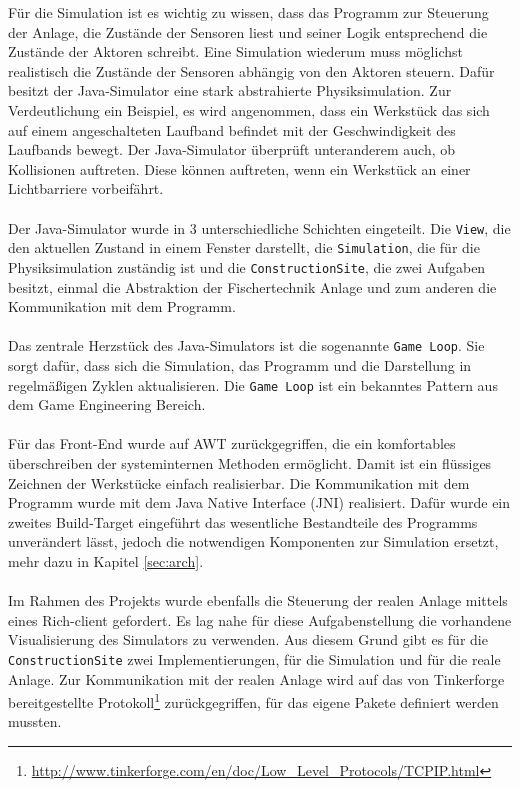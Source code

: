 \documentclass[fontsize=11pt,a4paper,final]{scrartcl}[2003/01/01]
\begin{document}
Für die Simulation ist es wichtig zu wissen, dass das Programm zur Steuerung der Anlage, die Zustände der Sensoren liest und seiner Logik entsprechend die Zustände der Aktoren schreibt. Eine Simulation wiederum muss möglichst realistisch die Zustände der Sensoren abhängig von den Aktoren steuern. Dafür besitzt der Java-Simulator eine stark abstrahierte Physiksimulation. Zur Verdeutlichung ein Beispiel, es wird angenommen, dass ein Werkstück das sich auf einem angeschalteten Laufband befindet mit der Geschwindigkeit des Laufbands bewegt. Der Java-Simulator überprüft unteranderem auch, ob Kollisionen auftreten. Diese können auftreten, wenn ein Werkstück an einer Lichtbarriere vorbeifährt.\\
\\
Der Java-Simulator wurde in 3 unterschiedliche Schichten eingeteilt. Die \lstinline|View|, die den aktuellen Zustand in einem Fenster darstellt, die \lstinline|Simulation|, die für die Physiksimulation zuständig ist und die \lstinline|ConstructionSite|, die zwei Aufgaben besitzt, einmal die Abstraktion der Fischertechnik Anlage und zum anderen die Kommunikation mit dem Programm.\\
\\
Das zentrale Herzstück des Java-Simulators ist die sogenannte \lstinline|Game Loop|. Sie sorgt dafür, dass sich die Simulation, das Programm und die Darstellung in regelmäßigen Zyklen aktualisieren. Die \lstinline|Game Loop| ist ein bekanntes Pattern aus dem Game Engineering Bereich.\\
\\
Für das Front-End wurde auf AWT zurückgegriffen, die ein komfortables überschreiben der systeminternen Methoden ermöglicht. Damit ist ein flüssiges Zeichnen der Werkstücke einfach realisierbar. Die Kommunikation mit dem Programm wurde mit dem Java Native Interface (JNI) realisiert. Dafür wurde ein zweites Build-Target eingeführt das wesentliche Bestandteile des Programms unverändert lässt, jedoch die notwendigen Komponenten zur Simulation ersetzt, mehr dazu in Kapitel \ref{sec:arch}.\\
\\
Im Rahmen des Projekts wurde ebenfalls die Steuerung der realen Anlage mittels eines Rich-client gefordert. Es lag nahe für diese Aufgabenstellung die vorhandene Visualisierung des Simulators zu verwenden. Aus diesem Grund gibt es für die \lstinline|ConstructionSite| zwei Implementierungen, für die Simulation und für die reale Anlage. Zur Kommunikation mit der realen Anlage wird auf das von Tinkerforge bereitgestellte Protokoll\footnote{\url{http://www.tinkerforge.com/en/doc/Low_Level_Protocols/TCPIP.html}} zurückgegriffen, für das eigene Pakete definiert werden mussten.\\
\end{document}
